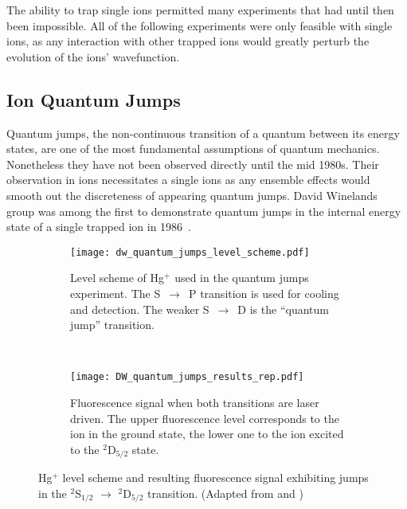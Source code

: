 The ability to trap  single ions permitted many experiments that had until
then been impossible. All of the following experiments were only feasible with single
ions, as any interaction with other trapped ions would greatly perturb the
evolution of the ions' wavefunction.

\subsection{Ion Quantum Jumps}
Quantum jumps, the non-continuous transition of a quantum between its energy
states, are one of the most fundamental assumptions of quantum mechanics.
Nonetheless they have not been observed directly until the mid 1980s. Their
observation in ions necessitates a single ions as any ensemble effects would
smooth out the discreteness of appearing quantum jumps. David Winelands group
was among the first to demonstrate quantum jumps in the internal energy state of a single
trapped ion in 1986~\cite{bergquist1986observation}. 
\begin{figure}[t]
  \centering
  \begin{subfigure}[t]{0.4\linewidth} 
    \centering
    \texttt{[image: dw\_quantum\_jumps\_level\_scheme.pdf]}
    \caption{Level scheme of Hg$^+$ used in the quantum jumps experiment. The
      S~$\rightarrow$~P transition is used for cooling and detection. The weaker
      S~$\rightarrow$~D is the ``quantum jump'' transition.}
    \label{fig:jumps_level_scheme}
  \end{subfigure}
  ~
  \begin{subfigure}[t]{0.48\linewidth} 
    \centering
    \texttt{[image: DW\_quantum\_jumps\_results\_rep.pdf]}
    \caption{Fluorescence signal when both transitions are laser driven. The
    upper fluorescence level corresponds to the ion in the ground state, the
    lower one to the ion excited to the $^2$D$_{5/2}$ state.}
    \label{fig:jumps_results}
  \end{subfigure}
  \caption{Hg$^+$ level scheme and resulting fluorescence signal exhibiting
  jumps in the $^2$S$_{1/2}$ $\rightarrow$ $^2$D$_{5/2}$ transition. (Adapted
from \cite{wineland2012nobel} and \cite{bergquist1986observation})}
\end{figure}

